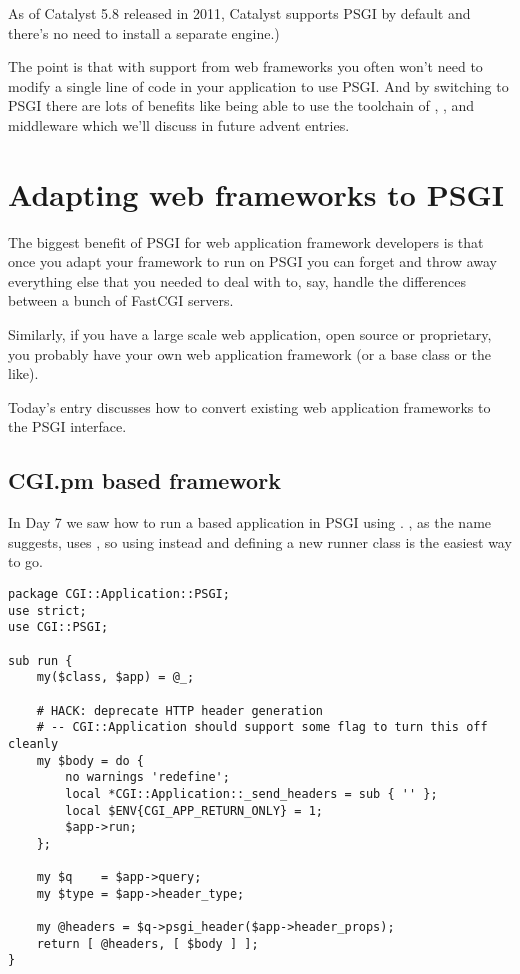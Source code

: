 \begin{note}
  As of Catalyst 5.8 released in 2011, Catalyst supports PSGI by default and
  there's no need to install a separate engine.)
\end{note}

The point is that with support from web frameworks you often won't need
to modify a single line of code in your application to use PSGI. And by
switching to PSGI there are lots of benefits like being able to use the
toolchain of , , and middleware which we'll discuss in
future advent entries.

\chapter{Adapting web frameworks to
PSGI}\label{day-8-adapting-web-frameworks-to-psgi}

The biggest benefit of PSGI for web application framework developers is
that once you adapt your framework to run on PSGI you can forget and
throw away everything else that you needed to deal with to, say, handle
the differences between a bunch of FastCGI servers.

Similarly, if you have a large scale web application, open source or
proprietary, you probably have your own web application framework (or a
base class or the like).

Today's entry discusses how to convert existing web application
frameworks to the PSGI interface.

\section{CGI.pm based framework}\label{cgi.pm-based-framework}

In Day 7 we saw how to run a  based application in PSGI
using . , as the name suggests,
uses , so using  instead and defining a new runner class
is the easiest way to go.

\begin{lstlisting}
package CGI::Application::PSGI;
use strict;
use CGI::PSGI;

sub run {
    my($class, $app) = @_;

    # HACK: deprecate HTTP header generation
    # -- CGI::Application should support some flag to turn this off cleanly
    my $body = do {
        no warnings 'redefine';
        local *CGI::Application::_send_headers = sub { '' };
        local $ENV{CGI_APP_RETURN_ONLY} = 1;
        $app->run;
    };

    my $q    = $app->query;
    my $type = $app->header_type;

    my @headers = $q->psgi_header($app->header_props);
    return [ @headers, [ $body ] ];
}
\end{lstlisting}

